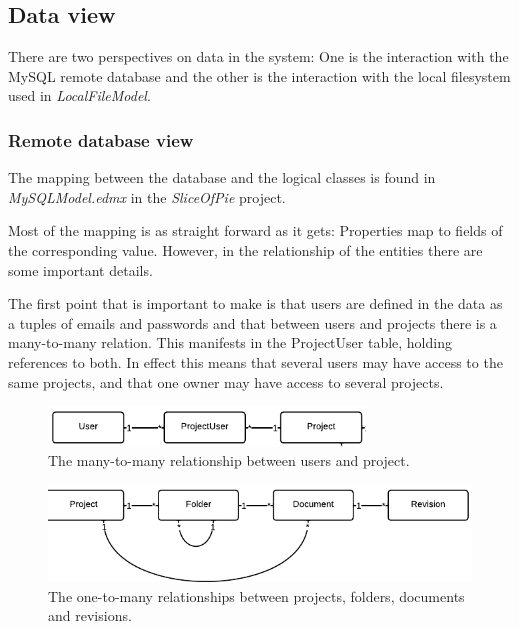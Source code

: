 \subsection{Data view}

There are two perspectives on data in the system: One is the interaction with the MySQL remote database
and the other is the interaction with the local filesystem used in \emph{LocalFileModel}.

\subsubsection{Remote database view}
The mapping between the database and the logical classes is found in \emph{MySQLModel.edmx} in the
\emph{SliceOfPie} project.

Most of the mapping is as straight forward as it gets: Properties map to fields of the corresponding value.
However, in the relationship of the entities there are some important details.

The first point that is important to make is that users are defined in the data as a tuples of emails
and passwords and that between users and projects there is a many-to-many relation. This manifests
in the ProjectUser table, holding references to both. In effect this means that several users may 
have access to the same projects, and that one owner may have access to several projects.

\begin{figure}[htb]
	\centering
	\includegraphics[width=0.75\textwidth]{Software_architecture/graphics/db-user-project.png}
	\caption{The many-to-many relationship between users and project.}
	\label{fig:db-user-project}
\end{figure}

\begin{figure}[htb]
	\centering
	\includegraphics[width=1.0\textwidth]{Software_architecture/graphics/db-project-folder-document.png}
	\caption{The one-to-many relationships between projects, folders, documents and revisions.}
	\label{fig:db-project-folder-document}
\end{figure}

